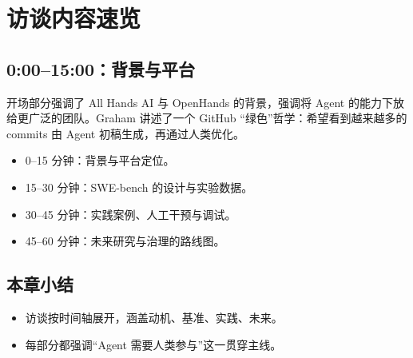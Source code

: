 \section{访谈内容速览}
\subsection{0:00--15:00：背景与平台}
开场部分强调了 All Hands AI 与 OpenHands 的背景，强调将 Agent 的能力下放给更广泛的团队。Graham 讲述了一个 GitHub “绿色”哲学：希望看到越来越多的 commits 由 Agent 初稿生成，再通过人类优化。

\begin{itemize}
    \item 0--15 分钟：背景与平台定位。
    \item 15--30 分钟：SWE-bench 的设计与实验数据。
    \item 30--45 分钟：实践案例、人工干预与调试。
    \item 45--60 分钟：未来研究与治理的路线图。
\end{itemize}

\subsection{本章小结}
\begin{itemize}
    \item 访谈按时间轴展开，涵盖动机、基准、实践、未来。
    \item 每部分都强调“Agent 需要人类参与”这一贯穿主线。
\end{itemize}


